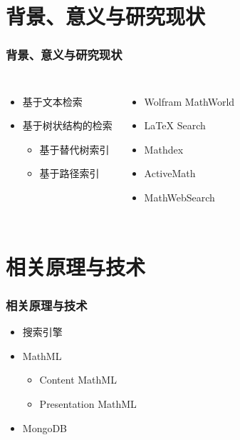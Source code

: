 \documentclass[17pt]{beamer}
\begin{document}
    \section{背景、意义与研究现状} %
    
    \begin{frame}
        \frametitle{背景、意义与研究现状} %
        \begin{columns} %
            \pause %

            \begin{itemize} %
                \item 基于文本检索
                \item 基于树状结构的检索
                \begin{itemize} %
                    \item 基于替代树索引
                    \item 基于路径索引
                \end{itemize}
            \end{itemize}

            \pause

            \begin{itemize}
                \item Wolfram MathWorld
                \item LaTeX Search
                \item Mathdex
                \item ActiveMath
                \item MathWebSearch
            \end{itemize}

        \end{columns}
    \end{frame}
    
    \section{相关原理与技术}
    
    \begin{frame}
        \frametitle{相关原理与技术}
        
        \begin{itemize}
          \item<2-> 搜索引擎 %
          \item<4-> MathML
          \begin{itemize}
            \item<4-> Content MathML
            \item<4-> Presentation MathML
          \end{itemize}
          \item<3-> MongoDB
        \end{itemize}
    \end{frame}
\end{document}
